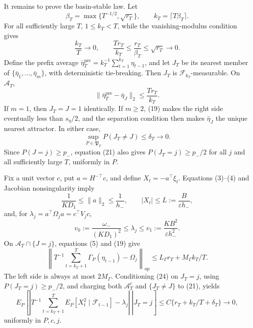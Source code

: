 It remains to prove the basin-stable law. Let
\[
 \beta_T=\max\{T^{-1/2},\sqrt{r_T}\},\qquad
 k_T=\lceil T\beta_T\rceil. \tag{18}
\]
For all sufficiently large \(T\), \(1\le k_T<T\), while the vanishing-modulus condition gives
\[
 \frac{k_T}{T}\longrightarrow0,
 \qquad \frac{Tr_T}{k_T}\le\frac{r_T}{\beta_T}\le\sqrt{r_T}\longrightarrow0. \tag{19}
\]
Define the prefix average \(\bar\eta_T^{\mathrm{pre}}=k_T^{-1}\sum_{t=1}^{k_T}\eta_{t-1}\), and let \(J_T\) be its nearest member of \(\{\bar\eta_1,\ldots,\bar\eta_m\}\), with deterministic tie-breaking. Then \(J_T\) is \(\mathcal F_{k_T}\)-measurable. On \(\mathcal A_T\),
\[
 \|\bar\eta_T^{\mathrm{pre}}-\bar\eta_J\|_2
 \le\frac{Tr_T}{k_T}. \tag{20}
\]
If \(m=1\), then \(J_T=J=1\) identically. If \(m\ge2\), (19) makes the right side eventually less than \(s_\eta/2\), and the separation condition then makes \(\bar\eta_J\) the unique nearest attractor. In either case,
\[
 \sup_{P\in\mathfrak P_T}P(J_T\ne J)\le\delta_T\longrightarrow0. \tag{21}
\]
Since \(P(J=j)\ge p_-\), equation (21) also gives \(P(J_T=j)\ge p_-/2\) for all \(j\) and all sufficiently large \(T\), uniformly in \(P\).

Fix a unit vector \(c\), put \(a=H^{-\top}c\), and define \(X_t=-a^\top\xi_t\). Equations (3)--(4) and Jacobian nonsingularity imply
\[
 \frac1{KD_1}\le\|a\|_2\le\frac1{h_-},
 \qquad |X_t|\le L:=\frac{B}{\varepsilon h_-}, \tag{22}
\]
and, for \(\lambda_j=a^\top\Omega_ja=c^\top V_jc\),
\[
 v_0:=\frac{\omega_-}{(KD_1)^2}\le\lambda_j
 \le v_1:=\frac{KB^2}{\varepsilon h_-^2}. \tag{23}
\]
On \(\mathcal A_T\cap\{J=j\}\), equations (5) and (19) give
\[
 \left\|T^{-1}\sum_{t=k_T+1}^T\Gamma_P(\eta_{t-1})-\Omega_j\right\|_{\mathrm{op}}
 \le L_\Gamma r_T+M_\Gamma k_T/T. \tag{24}
\]
The left side is always at most \(2M_\Gamma\). Conditioning (24) on \(J_T=j\), using \(P(J_T=j)\ge p_-/2\), and charging both \(\mathcal A_T^c\) and \(\{J_T\ne J\}\) to (21), yields
\[
 E_P\!\left[\left.\left|T^{-1}\sum_{t=k_T+1}^T
 E_P[X_t^2\mid\mathcal F_{t-1}]-\lambda_j\right|\ \right|J_T=j\right]
 \le C\{r_T+k_T/T+\delta_T\}\longrightarrow0, \tag{25}
\]
uniformly in \(P,c,j\).

